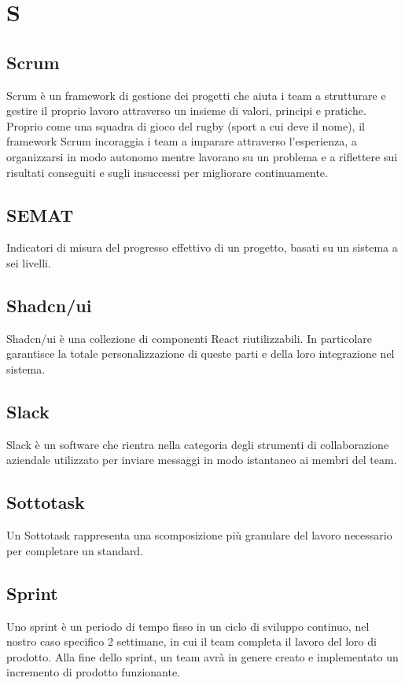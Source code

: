 \chapter{S}

\section{Scrum}
Scrum è un framework di gestione dei progetti  che aiuta i team a strutturare e gestire il proprio lavoro attraverso un insieme di valori, principi e pratiche. Proprio come una squadra di gioco del rugby (sport a cui deve il nome), il framework Scrum incoraggia i team a imparare attraverso l'esperienza, a organizzarsi in modo autonomo mentre lavorano su un problema e a riflettere sui risultati conseguiti e sugli insuccessi per migliorare continuamente.

\section{SEMAT}
Indicatori di misura del progresso effettivo di un progetto, basati su un sistema a sei livelli.

\section{Shadcn/ui}
Shadcn/ui è una collezione di componenti React riutilizzabili. In particolare garantisce la totale personalizzazione di queste parti e della loro integrazione nel sistema.  

\section{Slack}
Slack è un software che rientra nella categoria degli strumenti di collaborazione aziendale utilizzato per inviare messaggi in modo istantaneo ai membri del team.

\section{Sottotask}
Un Sottotask rappresenta una scomposizione più granulare del lavoro necessario per completare un  standard.

\section{Sprint}
Uno sprint è un periodo di tempo fisso in un ciclo di sviluppo continuo, nel nostro caso specifico 2 settimane, in cui il team completa il lavoro del loro  di prodotto. Alla fine dello sprint, un team avrà in genere creato e implementato un incremento di prodotto funzionante.

